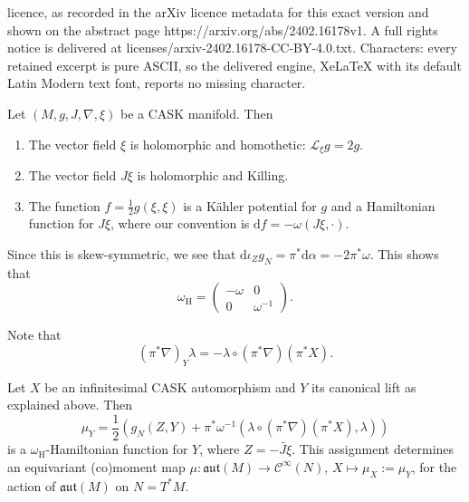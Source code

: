 \documentclass[10pt,a4paper]{amsart}
\newcommand{\aut}{\mathfrak{aut}}
\newcommand{\calC}{\mathcal{C}}
\newcommand{\hor}{\mathrm{H}}
\renewcommand{\d}{\mathrm{d}}
\begin{document}
licence, as recorded in the arXiv licence metadata for this exact version and shown on the abstract page https://arxiv.org/abs/2402.16178v1. A full rights notice is delivered at licenses/arxiv-2402.16178-CC-BY-4.0.txt. Characters: every retained excerpt is pure ASCII, so the delivered engine, XeLaTeX with its default Latin Modern text font, reports no missing character.
	\begin{proposition}\label{prop:basis_CASK}
		Let $(M,g,J,\nabla,\xi)$ be a CASK manifold. Then \begin{enumerate}[\normalfont(a)]
			\itemsep 0em
			\item The vector field $\xi$ is holomorphic and homothetic: $\mathcal L_\xi g = 2g$.
			\item The vector field $J\xi$ is holomorphic and Killing.
			\item The function $f=\frac{1}{2}g(\xi,\xi)$ is a K\"ahler potential for $g$ and a Hamiltonian function for $J\xi$, where our convention is $\d f=-\omega(J\xi,\cdot)$.
		\end{enumerate}
	\end{proposition}

		Since this is skew-symmetric, we see that $\d\iota_Zg_N=\pi^*\d\alpha=-2\pi^*\omega$. This shows that \begin{equation}\label{oH:eq}
			\omega_\hor=\begin{pmatrix}
				-\omega&0\\
				0&\omega^{-1}
			\end{pmatrix}.
		\end{equation}

	Note that \begin{equation}\label{pi*nabla:eq}
		(\pi^*\nabla)_Y\lambda=-\lambda\circ(\pi^*\nabla)(\pi^*X).
	\end{equation}

	\begin{proposition}\label{prop:moment_map}
		Let $X$ be an infinitesimal CASK automorphism and $Y$ its canonical lift as explained above. Then $$\mu_Y=\frac{1}{2}\left(g_N(Z,Y)+\pi^*\omega^{-1}(\lambda\circ(\pi^*\nabla)(\pi^*X),\lambda)\right)$$ is a $\omega_\hor$-Hamiltonian function for $Y$, where $Z=-\widetilde{J\xi}$. This assignment determines an equivariant (co)moment map $\mu:\aut(M)\longrightarrow\calC^\infty(N)$, $X\longmapsto\mu_X:=\mu_Y$, for the action of $\aut(M)$ on $N=T^*M$.
	\end{proposition}
\end{document}
